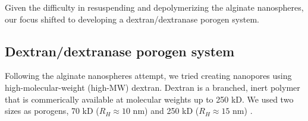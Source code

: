 Given the difficulty in resuspending and depolymerizing the alginate nanospheres, our focus shifted to developing a dextran/dextranase porogen system.

\subsection{Dextran/dextranase porogen system}
Following the alginate nanospheres attempt, we tried creating nanopores using high-molecular-weight (high-MW) dextran.  Dextran is a branched, inert polymer that is commerically available at molecular weights up to 250 kD.  We used two sizes as porogens, 70 kD ($R_H \approx 10$ nm) and 250 kD ($R_H \approx 15$ nm) \cite{masuelli13}.  

